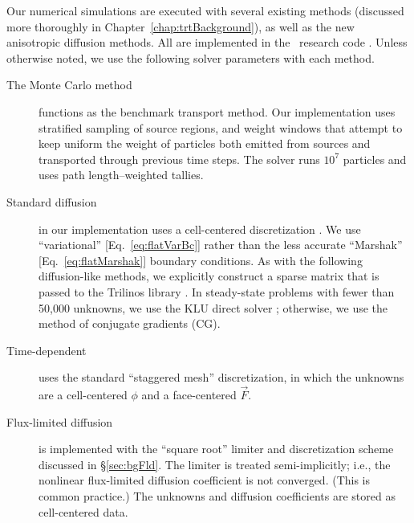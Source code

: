 Our numerical simulations are executed with several existing methods
(discussed more thoroughly in Chapter~\ref{chap:trtBackground}), as well
as the new anisotropic diffusion methods. All
are implemented in the \pytrt\ research code \cite{Pytrt}. Unless otherwise
noted, we use the following solver parameters with each method.
\begin{description}
  \item[The Monte Carlo method] functions as the benchmark transport method. Our
    implementation uses stratified sampling of source regions, and weight
    windows that attempt to keep uniform the weight of particles both emitted
    from sources and transported through previous time steps. The solver runs
    $10^7$ particles and uses path length--weighted tallies.

  \item[Standard diffusion] in our implementation uses a cell-centered
    discretization \cite{Dud1976}.  We use ``variational''
    [Eq.~\eqref{eq:flatVarBc}] rather than the less
    accurate ``Marshak'' [Eq.~\eqref{eq:flatMarshak}] boundary conditions.
    As with the following diffusion-like methods, we explicitly
    construct a sparse matrix that is passed to the Trilinos library
    \cite{Her2003}.  In steady-state problems with fewer than 50,000 unknowns,
    we use the KLU direct solver \cite{Her2003}; otherwise, we use the method
    of conjugate gradients (CG).

  \item[Time-dependent \Pone] uses the standard ``staggered mesh''
    discretization, in which the unknowns are a cell-centered $\phi$ and
    a face-centered $\vec{F}$.

  \item[Flux-limited diffusion] is implemented with the ``square root'' limiter
    and discretization scheme discussed in \S\ref{sec:bgFld}. The limiter is
    treated semi-implicitly; i.e., the nonlinear flux-limited diffusion
    coefficient is not converged. (This is common practice.) The unknowns and
    diffusion coefficients are stored as cell-centered data.


\end{description}
